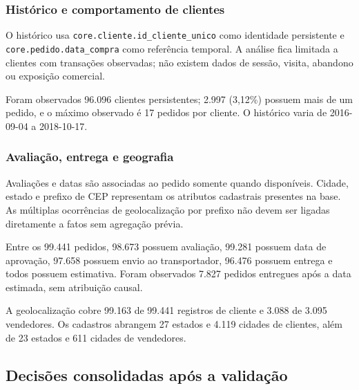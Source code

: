 \documentclass[12pt,a4paper]{article}
\begin{document}
\subsubsection{Histórico e comportamento de
clientes}\label{docs__analytics__matriz_validacao_requisitos_funcionais.md__histuxf3rico-e-comportamento-de-clientes}

O histórico usa \nolinkurl{core.cliente.id_cliente_unico} como
identidade persistente e \nolinkurl{core.pedido.data_compra} como
referência temporal. A análise fica limitada a clientes com transações
observadas; não existem dados de sessão, visita, abandono ou exposição
comercial.

Foram observados 96.096 clientes persistentes; 2.997 (3,12\%) possuem
mais de um pedido, e o máximo observado é 17 pedidos por cliente. O
histórico varia de 2016-09-04 a 2018-10-17.

\subsubsection{Avaliação, entrega e
geografia}\label{docs__analytics__matriz_validacao_requisitos_funcionais.md__avaliauxe7uxe3o-entrega-e-geografia}

Avaliações e datas são associadas ao pedido somente quando disponíveis.
Cidade, estado e prefixo de CEP representam os atributos cadastrais
presentes na base. As múltiplas ocorrências de geolocalização por
prefixo não devem ser ligadas diretamente a fatos sem agregação prévia.

Entre os 99.441 pedidos, 98.673 possuem avaliação, 99.281 possuem data
de aprovação, 97.658 possuem envio ao transportador, 96.476 possuem
entrega e todos possuem estimativa. Foram observados 7.827 pedidos
entregues após a data estimada, sem atribuição causal.

A geolocalização cobre 99.163 de 99.441 registros de cliente e 3.088 de
3.095 vendedores. Os cadastros abrangem 27 estados e 4.119 cidades de
clientes, além de 23 estados e 611 cidades de vendedores.

\subsection{Decisões consolidadas após a
validação}\label{docs__analytics__matriz_validacao_requisitos_funcionais.md__decisuxf5es-e-impacto-nas-pruxf3ximas-etapas}
\end{document}
